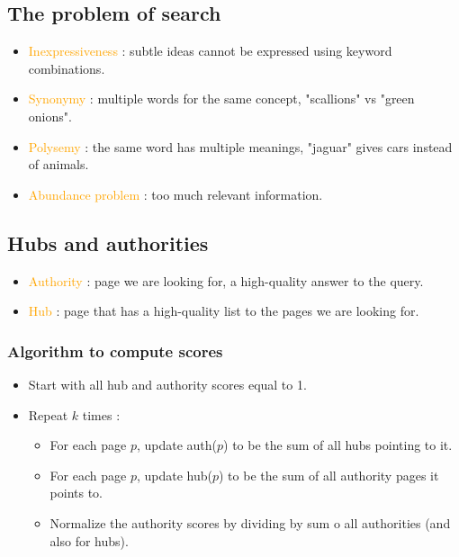 \subsection{The problem of search}

\begin{itemize}
\item \textcolor{orange}{Inexpressiveness} : subtle ideas cannot be expressed using keyword combinations.
\item \textcolor{orange}{Synonymy} : multiple words for the same concept, "scallions" vs "green onions".
\item \textcolor{orange}{Polysemy} : the same word has multiple meanings, "jaguar" gives cars instead of animals.
\item \textcolor{orange}{Abundance problem} : too much relevant information.
\end{itemize}

\subsection{Hubs and authorities}

\begin{itemize}
\item \textcolor{orange}{Authority} : page we are looking for, a high-quality answer to the query.
\item \textcolor{orange}{Hub} : page that has a high-quality list to the pages we are looking for.
\end{itemize}

\subsubsection{Algorithm to compute scores}

\begin{itemize}
\item Start with all hub and authority scores equal to 1.
\item Repeat $k$ times :
	\begin{itemize}
	\item For each page $p$, update auth($p$) to be the sum of all hubs pointing to it.
	\item For each page $p$, update hub($p$) to be the sum of all authority pages it points to.
	\item Normalize the authority scores by dividing by sum o all authorities (and also for hubs).
	\end{itemize}
\end{itemize}

